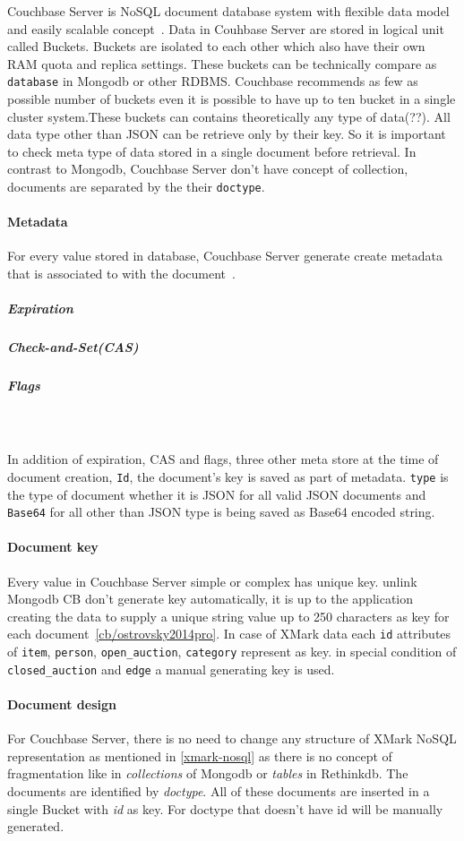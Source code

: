 Couchbase Server is NoSQL document database system with flexible data model and easily scalable concept~\cite{cb/brown2013developing}. Data in Couhbase Server are stored in logical unit called Buckets. Buckets are isolated to each other which also have their own RAM quota and replica settings. These buckets can be technically compare as \texttt{database} in Mongodb or other RDBMS. Couchbase recommends as few as possible number of buckets even it is possible to have up to ten bucket in a single cluster system.These buckets can contains theoretically any type of data(??). All data type other than JSON can be retrieve only by their key. So it is important to check meta type of data stored in a single document before retrieval. 
In contrast to Mongodb, Couchbase Server don't have concept of collection, documents are separated by the their \texttt{doctype}.
\paragraph{Metadata}
For every value stored in database, Couchbase Server generate create metadata that is associated to with the document~\cite{cb/ostrovsky2014pro}. 
	\subparagraph{Expiration}
	\subparagraph{Check-and-Set(CAS)}
	\subparagraph{Flags} 
	\\ 
	\\
In addition of expiration, CAS and flags, three other meta store at the time of document creation, \texttt{Id}, the document's key is saved as part of metadata. \texttt{type} is the type of document whether it is JSON for all valid JSON documents and \texttt{Base64} for all other than JSON type is being saved as Base64 encoded string.
\paragraph{Document key}
Every value in Couchbase Server simple or complex has unique key. unlink Mongodb CB don't generate key automatically, it is up to the application creating the data to supply a unique string value up to 250 characters as key for each document~\ref{cb/ostrovsky2014pro}.
In case of XMark data each \texttt{id} attributes of  \texttt{item}, \texttt{person}, \texttt{open\_auction}, \texttt{category} represent as key. in special condition of  \texttt{closed\_auction} and  \texttt{edge} a manual generating key is used.

\paragraph{Document design}
For Couchbase Server, there is no need to change any structure of XMark NoSQL representation as mentioned in \ref{xmark-nosql} as there is no concept of fragmentation like in \textit{collections} of Mongodb or \textit{tables} in Rethinkdb. The documents are identified by \textit{doctype}. All of these documents are inserted in a single Bucket with \textit{id} as key. For doctype that doesn't have id will be manually generated.


